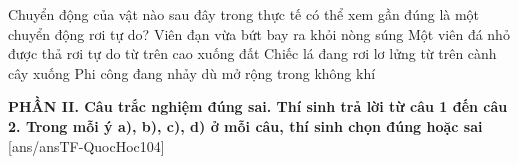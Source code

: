 \begin{ex}%
	Chuyển động của vật nào sau đây trong thực tế có thể xem gần đúng là một chuyển động rơi tự do?
	\choice
	{Viên đạn vừa bứt bay ra khỏi nòng súng}
	{\True Một viên đá nhỏ được thả rơi tự do từ trên cao xuống đất}
	{Chiếc lá đang rơi lơ lửng từ trên cành cây xuống}
	{Phi công đang nhảy dù mở rộng trong không khí}
\end{ex}


\noindent \textbf{PHẦN II. Câu trắc nghiệm đúng sai. Thí sinh trả lời từ câu 1 đến câu 2. Trong mỗi ý a), b), c), d) ở mỗi câu, thí sinh chọn đúng hoặc sai}
[ans/ansTF-QuocHoc104]

